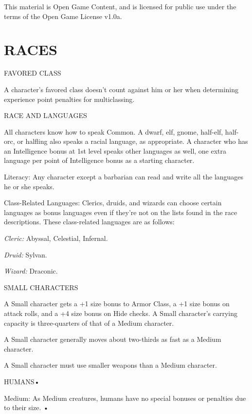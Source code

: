 \documentclass{article}
\begin{document}
This material is Open Game Content, and is licensed for public use under the terms 
of the Open Game License v1.0a.

\section*{{\LARGE{}RACES}}

\vspace{12pt}
FAVORED CLASS

A character's favored class doesn't count against him or her when determining experience 
point penalties for multiclassing. 

\vspace{12pt}
RACE AND LANGUAGES

All characters know how to speak Common. A dwarf, elf, gnome, half-elf, half-orc, 
or halfling also speaks a racial language, as appropriate. A character who has 
an Intelligence bonus at 1st level speaks other languages as well, one extra language 
per point of Intelligence bonus as a starting character. 

Literacy: Any character except a barbarian can read and write all the languages 
he or she speaks.

Class-Related Languages: Clerics, druids, and wizards can choose certain languages 
as bonus languages even if they're not on the lists found in the race descriptions. 
These class-related languages are as follows:

\textit{Cleric: }Abyssal, Celestial, Infernal.

\textit{Druid: }Sylvan.

\textit{Wizard: }Draconic.

\vspace{12pt}
SMALL CHARACTERS

A Small character gets a +1 size bonus to Armor Class, a +1 size bonus on attack 
rolls, and a +4 size bonus on Hide checks. A Small character's carrying capacity 
is three-quarters of that of a Medium character.

A Small character generally moves about two-thirds as fast as a Medium character.

A Small character must use smaller weapons than a Medium character.

\vspace{12pt}
{\LARGE{}HUMANS• }

\parindent=3pt
Medium: As Medium creatures, humans have no special bonuses or penalties due to 
their size. • 
\end{document}
